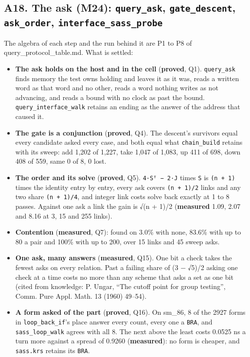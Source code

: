 \subsection{\texorpdfstring{A18. The ask (M24): \texttt{query\_\allowbreak{}ask}, \texttt{gate\_\allowbreak{}descent}, \texttt{ask\_\allowbreak{}order}, \texttt{interface\_\allowbreak{}sass\_\allowbreak{}probe}}{A18. The ask (M24): query\_ask, gate\_descent, ask\_order, interface\_sass\_probe}}

The algebra of each step and the run behind it are P1 to P8 of query\_\allowbreak{}protocol\_\allowbreak{}table.md. What is settled:

\begin{itemize}
\item \textbf{The ask holds on the host and in the cell} (\textbf{proved}, Q1). \texttt{query\_\allowbreak{}ask} finds memory the test owns holding and leaves it as it was, reads a written word as that word and no other, reads a word nothing writes as not advancing, and reads a bound with no clock as past the bound. \texttt{query\_\allowbreak{}interface\_\allowbreak{}walk} retains an ending as the answer of the address that caused it.
\item \textbf{The gate is a conjunction} (\textbf{proved}, Q4). The descent's survivors equal every candidate asked every case, and both equal what \texttt{chain\_\allowbreak{}build} retains with its sweep: add 1,202 of 1,227, take 1,047 of 1,083, up 411 of 698, down 408 of 559, same 0 of 8, 0 lost.
\item \textbf{The order and its solve} (\textbf{proved}, Q5). \texttt{4·Sᵀ − 2·J} times \texttt{S} is \texttt{(n + 1)} times the identity entry by entry, every ask covers \texttt{(n + 1)/\allowbreak{}2} links and any two share \texttt{(n + 1)/\allowbreak{}4}, and integer link costs solve back exactly at 1 to 8 passes. Against one ask a link the gain is √(n + 1)/2 (\textbf{measured} 1.09, 2.07 and 8.16 at 3, 15 and 255 links).
\item \textbf{Contention} (\textbf{measured}, Q7): found on 3.0\% with none, 83.6\% with up to 80 a pair and 100\% with up to 200, over 15 links and 45 sweep asks.
\item \textbf{One ask, many answers} (\textbf{measured}, Q15). One bit a check takes the fewest asks on every relation. Past a failing share of (3 − √5)/2 asking one check at a time costs no more than any scheme that asks a set as one bit (cited from knowledge: P. Ungar, “The cutoff point for group testing”, Comm. Pure Appl. Math. 13 (1960) 49–54).
\item \textbf{A form asked of the part} (\textbf{proved}, Q16). On sm\_\allowbreak{}86, 8 of the 2927 forms in \texttt{loop\_\allowbreak{}back\_\allowbreak{}if}'s place answer every count, every one a \texttt{BRA}, and \texttt{sass\_\allowbreak{}loop\_\allowbreak{}walk} agrees with all 8. The next above the least costs 0.0525 ns a turn more against a spread of 0.9260 (\textbf{measured}): no form is cheaper, and \texttt{sass.\allowbreak{}krs} retains its \texttt{BRA}.
\end{itemize}

